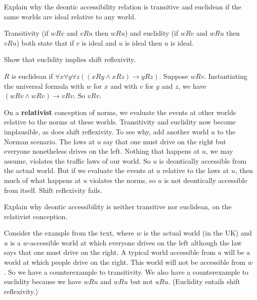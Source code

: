 
\begin{exercise}
  Explain why the deontic accessibility relation is transitive and euclidean if the same worlds are ideal relative to any world.
\end{exercise}
\begin{solution}
  Transitivity (if $wRv$ and $vRu$ then $wRu$) and euclidity (if $wRv$ and $wRu$
  then $vRu$) both state that if $v$ is ideal and $u$ is ideal then $u$ is
  ideal.
\end{solution}
\begin{exercise}
  Show that euclidity implies shift reflexivity.
\end{exercise}
\begin{solution}
  $R$ is euclidean if $\forall x \forall y \forall z((xRy \land xRz) \to yRz)$.
  Suppose $wRv$. Instantiating the universal formula with $w$ for $x$ and with
  $v$ for $y$ and $z$, we have $(wRv \land wRv) \to vRv$. So $vRv$.
\end{solution}


On a \textbf{relativist} conception of norms, we evaluate the events at other
worlds relative to the norms at these worlds. Transitivity and euclidity now
become implausible, as does shift reflexivity. To see why, add another world $u$
to the Norman scenario. The laws at $u$ say that one must drive on the right but
everyone nonetheless drives on the left. Nothing that happens at $u$, we may
assume, violates the traffic laws of our world. So $u$ is deontically accessible
from the actual world. But if we evaluate the events at $u$ relative to the laws
at $u$, then much of what happens at $u$ violates the norms, so $u$ is not
deontically accessible from itself. Shift reflexivity fails.

\begin{exercise}
  Explain why deontic accessibility is neither transitive nor euclidean, on
  the relativist conception.
\end{exercise}
\begin{solution}
  Consider the example from the text, where $w$ is the actual world (in the UK)
  and $u$ is a $w$-accessible world at which everyone drives on the left
  although the law says that one must drive on the right. A typical world
  accessible from $u$ will be a world at which people drive on the right. This
  world will not be accessible from $w$. So we have a counterexample to
  transitivity. We also have a counterexample to euclidity because we have $wRu$
  and $wRu$ but not $uRu$. (Euclidity entails shift reflexivity.)
\end{solution}


